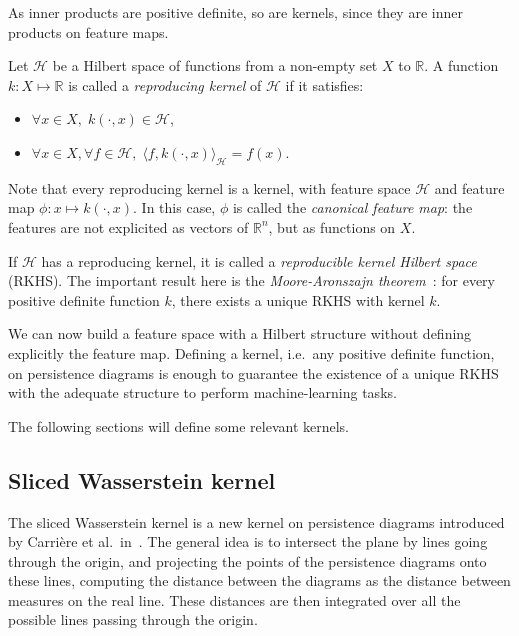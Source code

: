 \documentclass[a4paper,11pt,openany,extrafontsizes]{memoir}
\begin{document}
As inner products are positive definite, so are kernels, since they
are inner products on feature maps.

\begin{defn}
  Let $\mathcal{H}$ be a Hilbert space of functions from a non-empty
  set $X$ to $\mathbb{R}$. A function $k:X\mapsto\mathbb{R}$ is called
  a \emph{reproducing kernel} of $\mathcal{H}$ if it satisfies:
  \begin{itemize}
  \item $\forall x\in X,\; k(\cdot,x)\in\mathcal{H}$,
  \item
    $\forall x\in X, \forall f\in\mathcal{H},\; {\langle f,
      k(\cdot,x)\rangle}_{\mathcal{H}} = f(x)$.
  \end{itemize}
\end{defn}

Note that every reproducing kernel is a kernel, with feature space
$\mathcal{H}$ and feature map $\phi:x \mapsto k(\cdot,x)$. In this
case, $\phi$ is called the \emph{canonical feature map}: the features
are not explicited as vectors of $\mathbb{R}^n$, but as functions on
$X$.

If $\mathcal{H}$ has a reproducing kernel, it is called a
\emph{reproducible kernel Hilbert space} (RKHS). The important result
here is the \emph{Moore-Aronszajn
  theorem}~\cite{berlinet_reproducing_2011}: for every positive
definite function $k$, there exists a unique RKHS with kernel $k$.

We can now build a feature space with a Hilbert structure without
defining explicitly the feature map. Defining a kernel, i.e.\ any
positive definite function, on persistence diagrams is enough to
guarantee the existence of a unique RKHS with the adequate structure
to perform machine-learning tasks.

The following sections will define some relevant kernels.

\subsection{Sliced Wasserstein kernel}%
\label{sec:swk}

The sliced Wasserstein kernel is a new kernel on persistence diagrams
introduced by Carrière et al.\ in~\cite{carriere_sliced_2017}. The
general idea is to intersect the plane by lines going through the
origin, and projecting the points of the persistence diagrams onto
these lines, computing the distance between the diagrams as the
distance between measures on the real line. These distances are then
integrated over all the possible lines passing through the origin.
\end{document}
